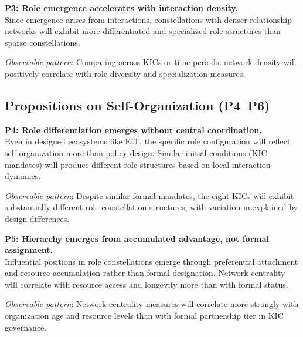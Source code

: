 \documentclass[../main.tex]{subfiles}
\begin{document}
\begin{propositionbox}
\textbf{P3: Role emergence accelerates with interaction density.}\\[3pt]
Since emergence arises from interactions, constellations with denser relationship networks will exhibit more differentiated and specialized role structures than sparse constellations.

\vspace{4pt}
\textit{Observable pattern}: Comparing across KICs or time periods, network density will positively correlate with role diversity and specialization measures.
\end{propositionbox}

\subsection{Propositions on Self-Organization (P4--P6)}

\begin{propositionbox}
\textbf{P4: Role differentiation emerges without central coordination.}\\[3pt]
Even in designed ecosystems like EIT, the specific role configuration will reflect self-organization more than policy design. Similar initial conditions (KIC mandates) will produce different role structures based on local interaction dynamics.

\vspace{4pt}
\textit{Observable pattern}: Despite similar formal mandates, the eight KICs will exhibit substantially different role constellation structures, with variation unexplained by design differences.
\end{propositionbox}

\begin{propositionbox}
\textbf{P5: Hierarchy emerges from accumulated advantage, not formal assignment.}\\[3pt]
Influential positions in role constellations emerge through preferential attachment and resource accumulation rather than formal designation. Network centrality will correlate with resource access and longevity more than with formal status.

\vspace{4pt}
\textit{Observable pattern}: Network centrality measures will correlate more strongly with organization age and resource levels than with formal partnership tier in KIC governance.
\end{propositionbox}
\end{document}
